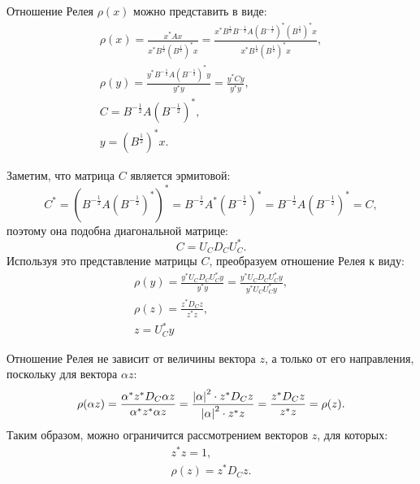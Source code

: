 Отношение Релея $\rho(x)$ можно представить в виде:
\begin{gather*}
    \rho(x)
    = \frac{x^* A x}{x^* B^\frac{1}{2} ( B^\frac{1}{2} )^* x}
    = \frac{x^* B^\frac{1}{2} B^{-\frac{1}{2}} A ( B^{-\frac{1}{2}} )^* ( B^\frac{1}{2} )^* x}{x^* B^\frac{1}{2} ( B^\frac{1}{2} )^* x} , \\
    \rho(y)
    = \frac{y^* B^{-\frac{1}{2}} A ( B^{-\frac{1}{2}} )^* y}{y^* y}
    = \frac{y^* C y}{y^* y}, \\
    C = B^{-\frac{1}{2}} A ( B^{-\frac{1}{2}} )^*, \\
    y = ( B^\frac{1}{2} )^* x .
\end{gather*}

Заметим, что матрица $C$ является эрмитовой:
\[
    C^*
    = ( B^{-\frac{1}{2}} A ( B^{-\frac{1}{2}} )^* )^*
    = B^{-\frac{1}{2}} A^* ( B^{-\frac{1}{2}} )^*
    = B^{-\frac{1}{2}} A ( B^{-\frac{1}{2}} )^*
    = C,
\]
поэтому она подобна диагональной матрице:
\[
    C = U_C D_C U_C^* .
\]
Используя это представление матрицы $C$, преобразуем отношение Релея к виду:
\begin{gather*}
    \rho(y)
    = \frac{y^* U_C D_C U_C^* y}{y^* y}
    = \frac{y^* U_C D_C U_C^* y}{y^* U_C U_C^* y} , \\
    \rho(z)
    = \frac{z^* D_C z}{z^* z} , \\
    z = U_C^* y
\end{gather*}

Отношение Релея не зависит от величины вектора $z$, а только от его направления, поскольку для вектора $\alpha z$:
\[
    \rho(\alpha z)
    = \frac{\alpha^* z^* D_C \alpha z}{ \alpha^* z^* \alpha z}
    = \frac{\left | \alpha \right |^2 \cdot z^* D_C z}{ \left | \alpha \right |^2 \cdot z^* z}
    = \frac{z^* D_C z}{z^* z}
    = \rho(z) .
\]
Таким образом, можно ограничится рассмотрением векторов $z$, для которых:
\begin{gather*}
    z^* z = 1 , \\
    \rho(z) = z^* D_C z .
\end{gather*}

